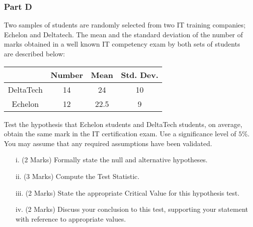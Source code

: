 \documentclass[a4paper,12pt]{article}
\begin{document}
\subsubsection*{Part D} %
Two samples of students are randomly selected from two IT training companies; Echelon and Deltatech. The mean and the standard deviation of the number of marks obtained in a well known IT competency exam by both sets of students are described below:\\

\begin{center}
\begin{tabular}{|c|c|c|c|}

  \hline
	&Number&	Mean&	Std. Dev.\\ \hline
DeltaTech	&14	&24	&10\\
Echelon	&12	&22.5	&9\\
  \hline
\end{tabular}
\end{center}


Test the hypothesis that Echelon students and DeltaTech students, on average, obtain the same mark in the IT certification exam. Use a significance level of $5\%$. You may assume that any required assumptions have been validated.
\bigskip

\begin{itemize}
\item[i.](2 Marks) Formally state the null and alternative hypotheses.
\item[ii.](3 Marks) Compute the Test Statistic.
\item[iii.](2 Marks) State the appropriate Critical Value for this hypothesis test.
\item[iv.](2 Marks) Discuss your conclusion to this test, supporting your statement with reference to appropriate values.
\end{itemize}

\newpage

\end{document}
